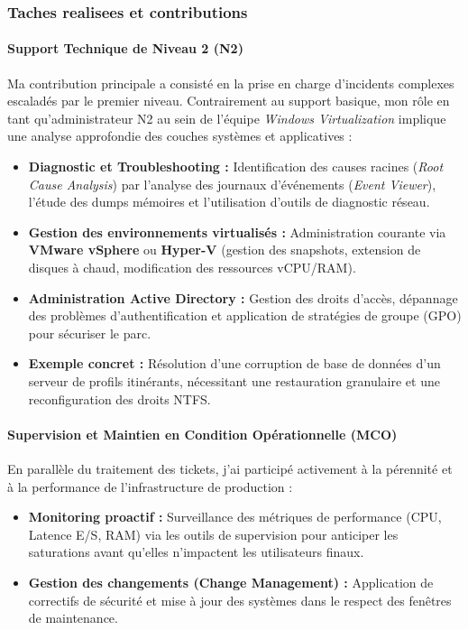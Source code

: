 \subsubsection{Taches realisees et contributions}

\paragraph{Support Technique de Niveau 2 (N2)}
Ma contribution principale a consisté en la prise en charge d'incidents complexes escaladés par le premier niveau. Contrairement au support basique, mon rôle en tant qu'administrateur N2 au sein de l'équipe \textit{Windows Virtualization} implique une analyse approfondie des couches systèmes et applicatives :

\begin{itemize}
    \item \textbf{Diagnostic et Troubleshooting :} Identification des causes racines (\textit{Root Cause Analysis}) par l'analyse des journaux d'événements (\textit{Event Viewer}), l'étude des dumps mémoires et l'utilisation d'outils de diagnostic réseau.
    \item \textbf{Gestion des environnements virtualisés :} Administration courante via \textbf{VMware vSphere} ou \textbf{Hyper-V} (gestion des snapshots, extension de disques à chaud, modification des ressources vCPU/RAM).
    \item \textbf{Administration Active Directory :} Gestion des droits d'accès, dépannage des problèmes d'authentification et application de stratégies de groupe (GPO) pour sécuriser le parc.
    \item \textbf{Exemple concret :} Résolution d'une corruption de base de données d'un serveur de profils itinérants, nécessitant une restauration granulaire et une reconfiguration des droits NTFS.
\end{itemize}

\paragraph{Supervision et Maintien en Condition Opérationnelle (MCO)}
En parallèle du traitement des tickets, j'ai participé activement à la pérennité et à la performance de l'infrastructure de production :

\begin{itemize}
    \item \textbf{Monitoring proactif :} Surveillance des métriques de performance (CPU, Latence E/S, RAM) via les outils de supervision pour anticiper les saturations avant qu'elles n'impactent les utilisateurs finaux.
    \item \textbf{Gestion des changements (Change Management) :} Application de correctifs de sécurité et mise à jour des systèmes dans le respect des fenêtres de maintenance.
\end{itemize}
